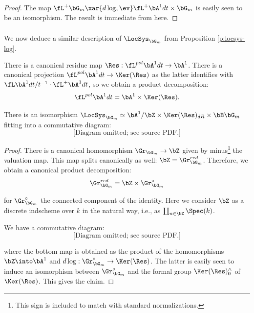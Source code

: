 \begin{proof}

The map $\fL^+ \bG_m \xar{d\log,\ev} \fL^+ \bA^1 dt \times \bG_m$
is easily seen to be an isomorphism. The result is immediate
from here.

\end{proof}

\subsubsection{}

We now deduce a similar description of $\LocSys_{\bG_m}$
from Proposition \ref{p:locsys-log}.

There is a canonical residue map
$\Res:\fL^{pol} \bA^1 dt \to \bA^1$. There is a canonical projection
$\fL^{pol} \bA^1 dt \to \Ker(\Res)$ as the latter identifies
with $\fL \bA^1 dt/t^{-1} \cdot \fL^+ \bA^1 dt$,
so we obtain a product decomposition:
%
\[
\fL^{pol} \bA^1 dt = \bA^1 \times \Ker(\Res).
\]

\begin{prop}
\notready\label{p:locsys}

There is an isomorphism $\LocSys_{\bG_m} \simeq
\bA^1/\bZ \times \Ker(\Res)_{dR} \times \bB \bG_m$ fitting
into a commutative diagram:
%
\[
\text{[Diagram omitted; see source PDF.]}
\]

\end{prop}

\begin{proof}

There is a canonical homomorphism
$\Gr_{\bG_m} \to \bZ$ given by minus\footnote{This sign is included to match
with standard normalizations.} the valuation map. This map splits
canonically as well: $\bZ = \Gr_{\bG_m}^{red}$.
Therefore, we obtain a canonical product decomposition:
%
\[
\Gr_{\bG_m}^{red} = \bZ \times \Gr_{\bG_m}^{\circ}
\]

 for $\Gr_{\bG_m}^{\circ}$ the connected component
of the identity. Here we consider $\bZ$ as a discrete indscheme
over $k$ in the natural way, i.e., as $\coprod_{n \in \bZ} \Spec(k)$.

We have a commutative diagram:
%
\[
\text{[Diagram omitted; see source PDF.]}
\]

 where the bottom map is obtained as the product
of the homomorphisms $\bZ \into \bA^1$ and
$d\log:\Gr_{\bG_m}^{\circ} \to \Ker(\Res)$. The latter
is easily seen to induce an isomorphism between
$\Gr_{\bG_m}^{\circ}$ and the formal group
$\Ker(\Res)_0^{\wedge}$ of $\Ker(\Res)$. This gives the claim.

\end{proof}

